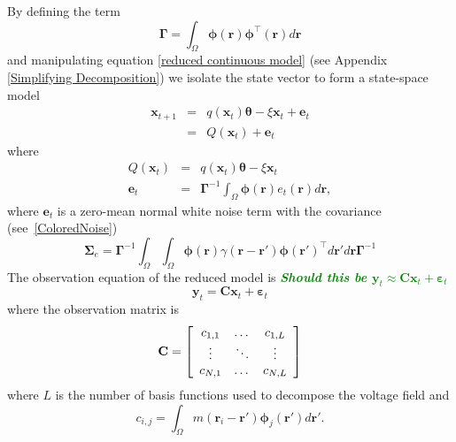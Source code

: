 \documentclass[12pt]{iopart}
\newcommand{\omg}[1]{\textsf{\emph{\textbf{\textcolor{green}{#1}}}}}
\begin{document}
By defining the term 
\begin{equation}
	\label{DefGamma} \boldsymbol{\Gamma} = \int_\Omega {\boldsymbol{\phi} \left(\mathbf{r}\right)\boldsymbol{\phi} ^{\top}\left(\mathbf{r}\right)d\mathbf{r}} 
\end{equation}
and manipulating equation \ref{reduced continuous model} (see Appendix \ref{Simplifying Decomposition}) we isolate the state vector to form a state-space model 
\begin{eqnarray}
	\label{Homogeneous SS Model} \mathbf{x}_{t+1} &=& q(\mathbf{x}_t)\boldsymbol{\theta} - \xi\mathbf{x}_t + \mathbf{e}_t \\
	&=& Q\left(\mathbf{x}_t\right) + \mathbf{e}_t 
\end{eqnarray}
where
\begin{eqnarray}
Q\left( \mathbf{x}_t \right) &=& q(\mathbf{x}_t)\boldsymbol{\theta} - \xi\mathbf{x}_t \label{eq:QmatrixForSigmapoints}\\
	\mathbf{e}_t &=& \label{eq:Reducednoiseterm} \boldsymbol{\Gamma}^{-1}\int_\Omega{\boldsymbol{\phi}(\mathbf{r})e_t(\mathbf{r})d\mathbf{r}}, 
\end{eqnarray}
where $\mathbf{e}_t$ is a zero-mean normal white noise term with the covariance (see~\ref{ColoredNoise}) 
\begin{equation}
	\boldsymbol{\Sigma}_e=\boldsymbol{\Gamma}^{-1}\int_{\Omega}\int_{\Omega}\boldsymbol{\phi}\left(\mathbf r\right) \gamma\left(\mathbf{r}- \mathbf{r}' \right)\boldsymbol{\phi}\left(\mathbf{r}'\right)^{\top}d\mathbf{r}' d\mathbf{r}\boldsymbol{\Gamma}^{-1} 
\end{equation}
The observation equation of the reduced model is \omg{Should this be $\mathbf{y}_t \approx \mathbf{C}\mathbf{x}_t + \boldsymbol{\varepsilon}_t$}
\begin{equation}
	\label{ObservationEquation} \mathbf{y}_t = \mathbf{C}\mathbf{x}_t + \boldsymbol{\varepsilon}_t 
\end{equation}
where the observation matrix is 
\begin{equation}
	\mathbf{C} = \left[
	\begin{array}{{ccc}} 
		c_{1,1} & \dots & c_{1,L} \\
		\vdots & \ddots & \vdots \\
		c_{N,1} & \dots & c_{N,L} 
	\end{array}
	\right] 
\end{equation}
where $L$ is the number of basis functions used to decompose the voltage field and 
\begin{equation}
	c_{i,j} = \int_{\Omega}m(\mathbf{r}_i - \mathbf{r}')\boldsymbol{\phi}_j(\mathbf{r}')d\mathbf{r}'. 
\end{equation}
\end{document}
